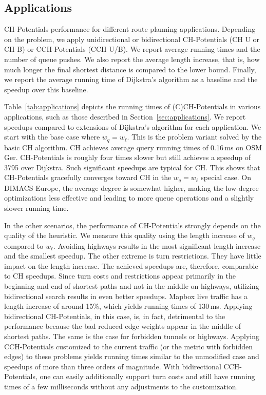 \documentclass[manuscript,review]{acmart}
\begin{document}
\subsection{Applications}

\begin{table}
\centering
\caption{
CH-Potentials performance for different route planning applications.
Depending on the problem, we apply unidirectional or bidirectional CH-Potentials (CH U or CH B) or CCH-Potentials (CCH U/B).
We report average running times and the number of queue pushes.
We also report the average length increase, that is, how much longer the final shortest distance is compared to the lower bound.
Finally, we report the average running time of Dijkstra's algorithm as a baseline and the speedup over this baseline.
}\label{tab:applications}

\end{table}

Table~\ref{tab:applications} depicts the running times of (C)CH-Potentials in various applications, such as those described in Section~\ref{sec:applications}.
We report speedups compared to extensions of Dijkstra's algorithm for each application.
We start with the base case where $w_q = w_\ell$.
This is the problem variant solved by the basic CH algorithm.
CH achieves average query running times of 0.16\,ms on OSM Ger.
CH-Potentials is roughly four times slower but still achieves a speedup of 3795 over Dijkstra.
Such significant speedups are typical for CH.
This shows that CH-Potentials gracefully converges toward CH in the $w_q = w_\ell$ special case.
On DIMACS Europe, the average degree is somewhat higher, making the low-degree optimizations less effective and leading to more queue operations and a slightly slower running time.

In the other scenarios, the performance of CH-Potentials strongly depends on the quality of the heuristic.
We measure this quality using the length increase of $w_q$ compared to $w_\ell$.
Avoiding highways results in the most significant length increase and the smallest speedup.
The other extreme is turn restrictions.
They have little impact on the length increase.
The achieved speedups are, therefore, comparable to CH speedups.
Since turn costs and restrictions appear primarily in the beginning and end of shortest paths and not in the middle on highways, utilizing bidirectional search results in even better speedups.
Mapbox live traffic has a length increase of around 15\%, which yields running times of 130\,ms.
Applying bidirectional CH-Potentials, in this case, is, in fact, detrimental to the performance because the bad reduced edge weights appear in the middle of shortest paths.
The same is the case for forbidden tunnels or highways.
Applying CCH-Potentials customized to the current traffic (or the metric with forbidden edges) to these problems yields running times similar to the unmodified case and speedups of more than three orders of magnitude.
With bidirectional CCH-Potentials, one can easily additionally support turn costs and still have running times of a few milliseconds without any adjustments to the customization.
\end{document}
